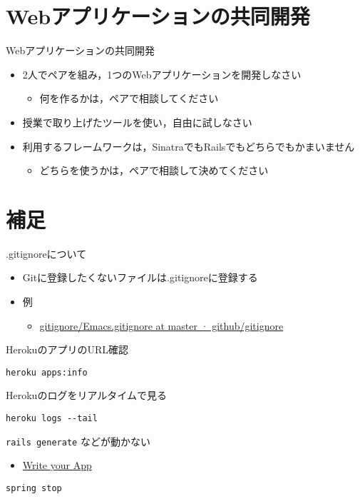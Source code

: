 \documentclass[t, aspectratio=169]{beamer}
\begin{document}
\part{Webアプリケーションの共同開発}
\label{sec-8}
\begin{frame}[label=sec-8-0-1]{Webアプリケーションの共同開発}
\begin{itemize}
\item 2人でペアを組み，1つのWebアプリケーションを開発しなさい
\begin{itemize}
\item 何を作るかは，ペアで相談してください
\end{itemize}
\item 授業で取り上げたツールを使い，自由に試しなさい
\item 利用するフレームワークは，SinatraでもRailsでもどちらでもかまいません
\begin{itemize}
\item どちらを使うかは，ペアで相談して決めてください
\end{itemize}
\end{itemize}
\end{frame}

\part{補足}
\label{sec-9}
\begin{frame}[label=sec-9-0-1]{.gitignoreについて}
\begin{itemize}
\item Gitに登録したくないファイルは.gitignoreに登録する
\item 例
\begin{itemize}
\item \href{https://github.com/github/gitignore/blob/master/Global/Emacs.gitignore}{gitignore/Emacs.gitignore at master · github/gitignore}
\end{itemize}
\end{itemize}
\end{frame}

\begin{frame}[fragile,label=sec-9-0-2]{HerokuのアプリのURL確認}
 \begin{verbatim}
heroku apps:info
\end{verbatim}
\end{frame}
\begin{frame}[fragile,label=sec-9-0-3]{Herokuのログをリアルタイムで見る}
 \begin{verbatim}
heroku logs --tail
\end{verbatim}
\end{frame}
\begin{frame}[fragile,label=sec-9-0-4]{\texttt{rails generate} などが動かない}
 \begin{itemize}
\item \href{https://devcenter.heroku.com/articles/getting-started-with-rails4#write-your-app}{Write your App}
\end{itemize}

\begin{verbatim}
spring stop
\end{verbatim}
\end{frame}
\end{document}
